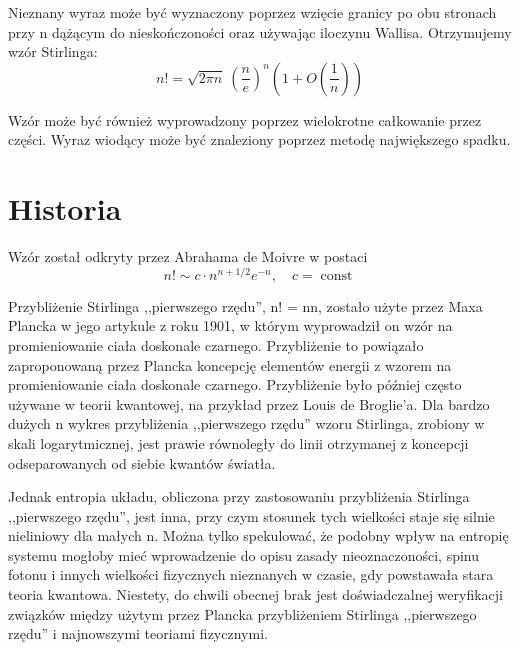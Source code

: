 \documentclass{article}
\begin{document}
Nieznany wyraz może być wyznaczony poprzez wzięcie granicy po obu stronach przy n dążącym do nieskończoności oraz używając iloczynu Wallisa. Otrzymujemy wzór Stirlinga: 
$$ n!={\sqrt {2\pi n}}\ \left({\frac {n}{e}}\right)^{n}\left(1+O\left({\frac {1}{n}}\right)\right) $$

Wzór może być również wyprowadzony poprzez wielokrotne całkowanie przez części. Wyraz wiodący może być znaleziony poprzez metodę największego spadku. 

\section*{Historia}
Wzór został odkryty przez Abrahama de Moivre w postaci 
\[ n!\sim c\cdot n^{n+1/2}e^{-n},\quad c=\operatorname {const} \]

Przybliżenie Stirlinga ,,pierwszego rzędu'', n! = nn, zostało użyte przez Maxa Plancka w jego artykule z roku 1901, w którym wyprowadził on wzór na promieniowanie ciała doskonale czarnego. Przybliżenie to powiązało zaproponowaną przez Plancka koncepcję elementów energii z wzorem na promieniowanie ciała doskonale czarnego. Przybliżenie było później często używane w teorii kwantowej, na przykład przez Louis de Broglie’a. Dla bardzo dużych n wykres przybliżenia ,,pierwszego rzędu'' wzoru Stirlinga, zrobiony w skali logarytmicznej, jest prawie równoległy do linii otrzymanej z koncepcji odseparowanych od siebie kwantów światła.

Jednak entropia układu, obliczona przy zastosowaniu przybliżenia Stirlinga ,,pierwszego rzędu'', jest inna, przy czym stosunek tych wielkości staje się silnie nieliniowy dla małych n. Można tylko spekulować, że podobny wpływ na entropię systemu mogłoby mieć wprowadzenie do opisu zasady nieoznaczoności, spinu fotonu i innych wielkości fizycznych nieznanych w czasie, gdy powstawała stara teoria kwantowa. Niestety, do chwili obecnej brak jest doświadczalnej weryfikacji związków między użytym przez Plancka przybliżeniem Stirlinga ,,pierwszego rzędu'' i najnowszymi teoriami fizycznymi. 
\end{document}
